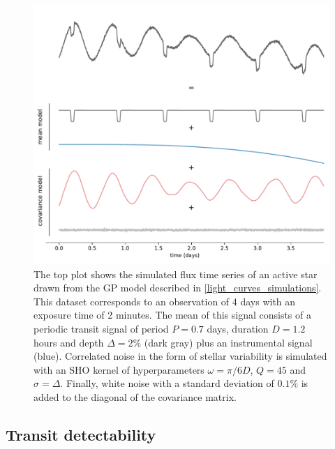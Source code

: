\documentclass[modern]{aastex631}
\begin{document}
\begin{figure}[H]
    \begin{centering}
        \includegraphics[width=\linewidth]{./principle_dataset_decomposed.pdf}
        \caption{The top plot shows the simulated flux time series of an active star drawn from the GP model described in \autoref{light_curves_simulations}. This dataset corresponds to an observation of 4 days with an exposure time of 2 minutes. The mean of this signal consists of a periodic transit signal of period $P=0.7$ days, duration $D=1.2$ hours and depth $\Delta=2\%$ (dark gray) plus an instrumental signal (blue). Correlated noise in the form of stellar variability is simulated with an SHO kernel of hyperparameters $\omega = \pi / 6 D$, $Q=45$ and $\sigma = \Delta$. Finally, white noise with a standard deviation of $0.1\%$ is added to the diagonal of the covariance matrix. }
        \label{fig:app_principle_dataset}
    \end{centering}
\end{figure}
\subsection{Transit detectability}\label{transit_detectability}
\end{document}
